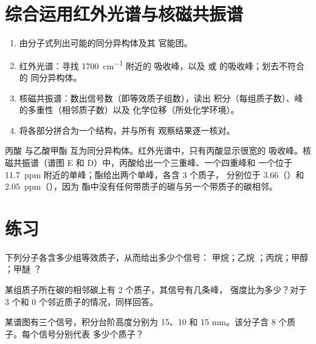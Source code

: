 \section{综合运用红外光谱与核磁共振谱}


\begin{method}[根据红外光谱与核磁共振谱鉴定分子]\label{met:g12:proton-nmr:identify}
\begin{enumerate}
  \item 由分子式列出可能的同分异构体及其
        官能团。
  \item 红外光谱：寻找 \qty{1700}{cm^{-1}} 附近的  吸收峰，以及
         或  的吸收峰；划去不符合的
        同分异构体。
  \item 核磁共振谱：数出信号数（即等效质子组数），读出
        积分（每组质子数）、峰的多重性（相邻质子数）以及
        化学位移（所处化学环境）。
  \item 将各部分拼合为一个结构，并与所有
        观察结果逐一核对。
\end{enumerate}
\end{method}

\begin{example}[两种同分异构体 \ce{C3H6O2}]\label{ex:g12:proton-nmr:isomers}
丙酸  与乙酸甲酯 
互为同分异构体。红外光谱中，只有丙酸显示很宽的 
吸收峰。核磁共振谱（谱图 E 和 D）中，丙酸给出一个三重峰、一个四重峰和
一个位于 \qty{11.7}{ppm} 附近的单峰；酯给出两个单峰，各含 3 个质子，
分别位于 3.66（）和 \qty{2.05}{ppm}（），因为
酯中没有任何带质子的碳与另一个带质子的碳相邻。
\end{example}

\section{练习}

\begin{exercise}[$\star$]\label{exo:g12:proton-nmr:1}
下列分子各含多少组等效质子，从而给出多少个信号：
甲烷；乙烷 ；丙烷；甲醇
；甲醚 ？
\end{exercise}

\begin{exercise}[$\star$]\label{exo:g12:proton-nmr:2}
某组质子所在碳的相邻碳上有 2 个质子，其信号有几条峰，
强度比为多少？对于 3 个和
0 个邻近质子的情况，同样回答。
\end{exercise}

\begin{exercise}[$\star$]\label{exo:g12:proton-nmr:3}
某谱图有三个信号，积分台阶高度分别为 15、10 和
15 mm。该分子含 8 个质子。每个信号分别代表
多少个质子？
\end{exercise}

